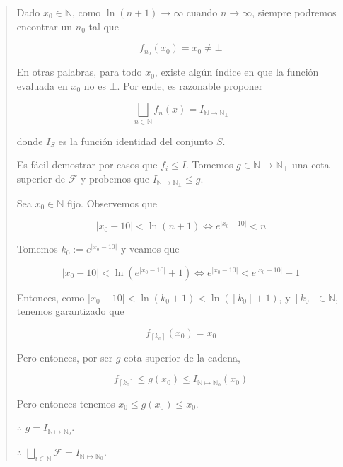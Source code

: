 \documentclass[article, 12pt]{article}
\begin{document}
\small
\begin{quote}

  Dado $x_0 \in \mathbb{N}$, como $\ln(n+1) \to \infty$ cuando $n \to \infty$,
  siempre podremos encontrar un $n_0$ tal que 

  \begin{equation*}
    f_{n_0}(x_0) = x_0 \neq \bot 
  \end{equation*}

En otras palabras, para todo $x_0$, existe algún índice en que la función
evaluada en $x_0$ no es $\bot $. Por ende, es razonable proponer

\begin{equation*}
  \bigsqcup_{n \in \mathbb{N}} f_n(x) = I_{\mathbb{N} \mapsto \mathbb{N}_\bot }
\end{equation*}

donde $I_S$ es la función identidad del conjunto $S$.

Es fácil demostrar por casos que $f_i \leq I$. Tomemos $g \in \mathbb{N} \to
\mathbb{N}_\bot $ una cota superior de $\mathcal{F}$ y probemos que
$I_{\mathbb{N} \to \mathbb{N}_\bot } \leq g$.

Sea $x_0 \in \mathbb{N}$ fijo. Observemos que


\begin{equation*}
  \left| x_0 - 10 \right| < \ln(n+1) \iff e^{\left| x_0 - 10 \right| } < n
\end{equation*}

Tomemos $k_0 := e^{\left| x_0 - 10 \right| }
$ y veamos que

\begin{equation*}
  \left| x_0 - 10 \right|  < \ln\left( e^{\left| x_0 - 10 \right|  } + 1
  \right) \iff e^{\left| x_0 - 10 \right| } < e^{\left| x_0 - 10 \right| } + 1
\end{equation*}

Entonces, como $\left| x_0 - 10 \right| < \ln(k_0 + 1) <
\ln(\left\lceil k_0 \right\rceil + 1) $, y $\left\lceil k_0 \right\rceil \in
\mathbb{N}$, tenemos garantizado que 

\begin{equation*}
  f_{\left\lceil k_0 \right\rceil }(x_0) = x_0
\end{equation*}

Pero entonces, por ser $g$ cota superior de la cadena, 

$$f_{\left\lceil k_0 \right\rceil } \leq g(x_0) \leq I_{\mathbb{N}\mapsto \mathbb{N}_0}(x_0)$$ 

Pero entonces tenemos $x_0 \leq g(x_0) \leq x_0$.

$\therefore $ $g = I_{\mathbb{N} \mapsto \mathbb{N}_0}$.

$\therefore $ $\bigsqcup_{i \in \mathbb{N}} \mathcal{F} = I_{\mathbb{N}
\mapsto \mathbb{N}_0}$.

\end{quote}
\normalsize
\end{document}
